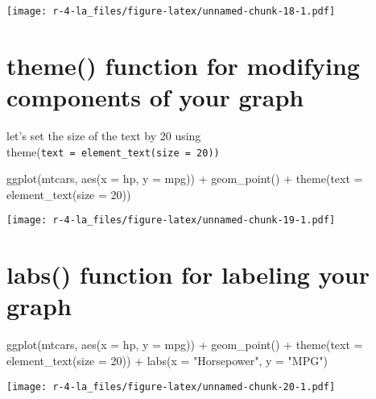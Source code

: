 \documentclass[
]{book}
\newenvironment{Shaded}{\begin{snugshade}}{\end{snugshade}}
\newcommand{\AttributeTok}[1]{\textcolor[rgb]{0.77,0.63,0.00}{#1}}
\newcommand{\DecValTok}[1]{\textcolor[rgb]{0.00,0.00,0.81}{#1}}
\newcommand{\FunctionTok}[1]{\textcolor[rgb]{0.00,0.00,0.00}{#1}}
\newcommand{\NormalTok}[1]{#1}
\newcommand{\SpecialCharTok}[1]{\textcolor[rgb]{0.00,0.00,0.00}{#1}}
\newcommand{\StringTok}[1]{\textcolor[rgb]{0.31,0.60,0.02}{#1}}
\begin{document}
\texttt{[image: r-4-la\_files/figure-latex/unnamed-chunk-18-1.pdf]}

\hypertarget{theme-function-for-modifying-components-of-your-graph}{%
\section{theme() function for modifying components of your graph}\label{theme-function-for-modifying-components-of-your-graph}}

let's set the size of the text by 20 using theme(\texttt{text\ =\ element\_text(size\ =\ 20))}

\begin{Shaded}
\begin{Highlighting}[]
\FunctionTok{ggplot}\NormalTok{(mtcars, }\FunctionTok{aes}\NormalTok{(}\AttributeTok{x =}\NormalTok{ hp, }\AttributeTok{y =}\NormalTok{ mpg)) }\SpecialCharTok{+}
  \FunctionTok{geom\_point}\NormalTok{() }\SpecialCharTok{+}
  \FunctionTok{theme}\NormalTok{(}\AttributeTok{text =} \FunctionTok{element\_text}\NormalTok{(}\AttributeTok{size =} \DecValTok{20}\NormalTok{))}
\end{Highlighting}
\end{Shaded}

\texttt{[image: r-4-la\_files/figure-latex/unnamed-chunk-19-1.pdf]}

\hypertarget{labs-function-for-labeling-your-graph}{%
\section{labs() function for labeling your graph}\label{labs-function-for-labeling-your-graph}}

\begin{Shaded}
\begin{Highlighting}[]
\FunctionTok{ggplot}\NormalTok{(mtcars, }\FunctionTok{aes}\NormalTok{(}\AttributeTok{x =}\NormalTok{ hp, }\AttributeTok{y =}\NormalTok{ mpg)) }\SpecialCharTok{+}
  \FunctionTok{geom\_point}\NormalTok{() }\SpecialCharTok{+}
  \FunctionTok{theme}\NormalTok{(}\AttributeTok{text =} \FunctionTok{element\_text}\NormalTok{(}\AttributeTok{size =} \DecValTok{20}\NormalTok{)) }\SpecialCharTok{+}
  \FunctionTok{labs}\NormalTok{(}\AttributeTok{x =} \StringTok{"Horsepower"}\NormalTok{, }\AttributeTok{y =} \StringTok{"MPG"}\NormalTok{)}
\end{Highlighting}
\end{Shaded}

\texttt{[image: r-4-la\_files/figure-latex/unnamed-chunk-20-1.pdf]}
\end{document}
